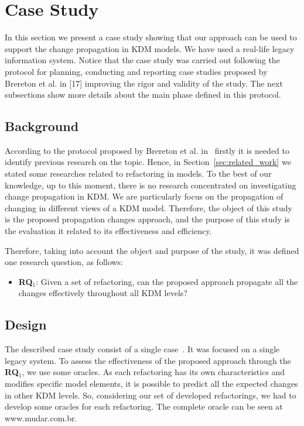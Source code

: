
\section{Case Study}\label{sec:case_study}

In this section we present a case study showing that our approach can be used to support the change propagation in KDM models. We have used a real-life legacy information system. 
Notice that the case study was carried out following the protocol for planning, conducting and reporting case studies proposed by Brereton et al. in [17] improving the rigor and validity of the study. The next subsections show more details about the main phase defined in this protocol.

\subsection{Background}

According to the protocol proposed by Brereton et al. in~\cite{Brereton:2008} firstly it is needed to identify previous research on the topic. Hence, in Section~\ref{sec:related_work} we stated some researches related to refactoring in models. To the best of our knowledge, up to this moment, there is no research concentrated on investigating change propagation in KDM. We are particularly focus on the propagation of changing in different views of a KDM model. Therefore, the object of this study is the proposed propagation changes approach, and the purpose of this study is the evaluation it related to its effectiveness and efficiency.

Therefore, taking into account the object and purpose of the study, it was defined one research question, as follows:

\begin{itemize}
\item \textbf{RQ$_1$}: Given a set of refactoring, can the proposed approach propagate all the changes effectively throughout all KDM levels?
\end{itemize}


\subsection{Design}

The described case study consist of a single case~\cite{Brereton:2008}. It was focused on a single legacy system. To assess the effectiveness of the proposed approach through the \textbf{RQ$_1$}, we use some oracles. As each refactoring has its own characteristics and modifies specific model elements, it is possible to predict all the expected changes in other KDM levels. So, considering our set of developed refactorings, we had to develop some oracles for each refactoring. The complete oracle can be seen at www.mudar.com.br.

